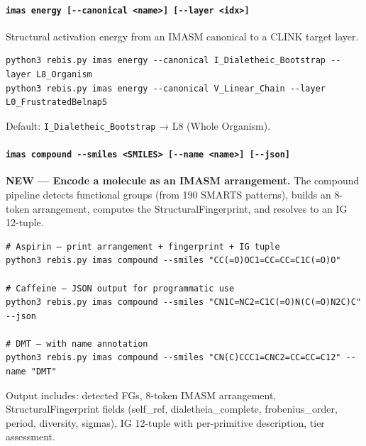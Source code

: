 \hypertarget{imas-energy---canonical-name---layer-idx}{%
\paragraph{\texorpdfstring{\texttt{imas\ energy\ {[}-\/-canonical\ \textless{}name\textgreater{}{]}\ {[}-\/-layer\ \textless{}idx\textgreater{}{]}}}{imas energy {[}-\/-canonical \textless name\textgreater{]} {[}-\/-layer \textless idx\textgreater{]}}}\label{imas-energy---canonical-name---layer-idx}}

Structural activation energy from an IMASM canonical to a CLINK target
layer.

\begin{verbatim}
python3 rebis.py imas energy --canonical I_Dialetheic_Bootstrap --layer L8_Organism
python3 rebis.py imas energy --canonical V_Linear_Chain --layer L0_FrustratedBelnap5
\end{verbatim}

Default: \texttt{I\_Dialetheic\_Bootstrap} → L8 (Whole Organism).

\hypertarget{imas-compound---smiles-smiles---name-name---json}{%
\paragraph{\texorpdfstring{\texttt{imas\ compound\ -\/-smiles\ \textless{}SMILES\textgreater{}\ {[}-\/-name\ \textless{}name\textgreater{}{]}\ {[}-\/-json{]}}}{imas compound -\/-smiles \textless SMILES\textgreater{} {[}-\/-name \textless name\textgreater{]} {[}-\/-json{]}}}\label{imas-compound---smiles-smiles---name-name---json}}

\textbf{NEW --- Encode a molecule as an IMASM arrangement.} The compound
pipeline detects functional groups (from 190 SMARTS patterns), builds an
8-token arrangement, computes the StructuralFingerprint, and resolves to
an IG 12-tuple.

\begin{verbatim}
# Aspirin — print arrangement + fingerprint + IG tuple
python3 rebis.py imas compound --smiles "CC(=O)OC1=CC=CC=C1C(=O)O"

# Caffeine — JSON output for programmatic use
python3 rebis.py imas compound --smiles "CN1C=NC2=C1C(=O)N(C(=O)N2C)C" --json

# DMT — with name annotation
python3 rebis.py imas compound --smiles "CN(C)CCC1=CNC2=CC=CC=C12" --name "DMT"
\end{verbatim}

Output includes: detected FGs, 8-token IMASM arrangement,
StructuralFingerprint fields (self\_ref, dialetheia\_complete,
frobenius\_order, period, diversity, sigmas), IG 12-tuple with
per-primitive description, tier assessment.

